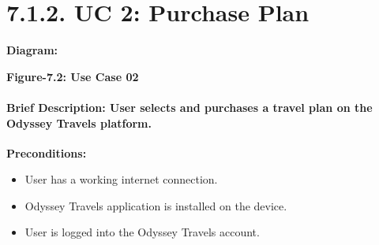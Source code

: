 \documentclass{scrreprt}
\begin{document}
\section*{\textbf{7.1.2. UC 2: Purchase Plan}}
\textbf{Diagram:}
\newline
\newline
\begin{center}
    \parbox{0.8\textwidth}{ 
        \centering
    }
\end{center}

\begin{center}
    \parbox{0.8\textwidth}{ 
        \centering
        \textbf{Figure-7.2: Use Case 02}
    }
\end{center}
\paragraph {\textnormal{Brief Description: 
User selects and purchases a travel plan on the Odyssey Travels platform.\newline
}}
\textbf{Preconditions:}
\begin{itemize}
    \item User has a working internet connection.
    \item Odyssey Travels application is installed on the device.
    \item User is logged into the Odyssey Travels account.
\end{itemize}
\end{document}
